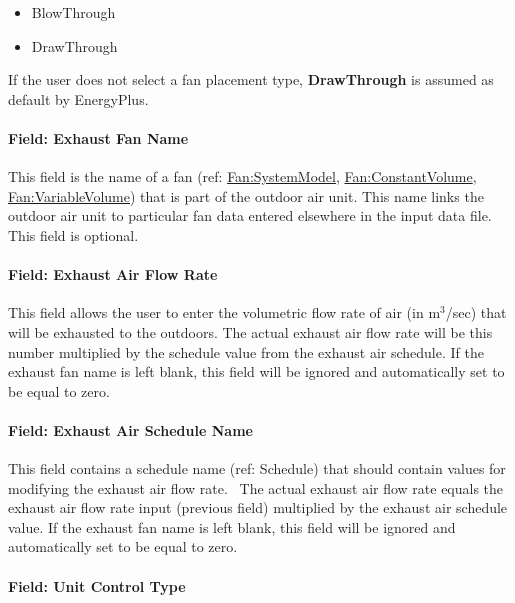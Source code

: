 \begin{itemize}
\item
  BlowThrough
\item
  DrawThrough
\end{itemize}

If the user does not select a fan placement type, \textbf{DrawThrough} is assumed as default by EnergyPlus.

\paragraph{Field: Exhaust Fan Name}\label{field-exhaust-fan-name}

This field is the name of a fan (ref: \hyperref[fansystemmodel]{Fan:SystemModel}, \hyperref[fanconstantvolume]{Fan:ConstantVolume}, \hyperref[fanvariablevolume]{Fan:VariableVolume}) that is part of the outdoor air unit. This name links the outdoor air unit to particular fan data entered elsewhere in the input data file. This field is optional.

\paragraph{Field: Exhaust Air Flow Rate}\label{field-exhaust-air-flow-rate}

This field allows the user to enter the volumetric flow rate of air (in m\(^{3}\)/sec) that will be exhausted to the outdoors. The actual exhaust air flow rate will be this number multiplied by the schedule value from the exhaust air schedule. If the exhaust fan name is left blank, this field will be ignored and automatically set to be equal to zero.

\paragraph{Field: Exhaust Air Schedule Name}\label{field-exhaust-air-schedule-name}

This field contains a schedule name (ref: Schedule) that should contain values for modifying the exhaust air flow rate.~ The actual exhaust air flow rate equals the exhaust air flow rate input (previous field) multiplied by the exhaust air schedule value. If the exhaust fan name is left blank, this field will be ignored and automatically set to be equal to zero.

\paragraph{Field: Unit Control Type}\label{field-unit-control-type}

